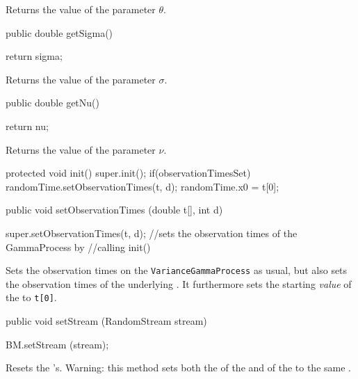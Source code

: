 \begin{tabb} Returns the value of the parameter $\theta$.
\end{tabb}
\begin{code}

   public double getSigma() \begin{hide} { return sigma; }\end{hide}
\end{code}
\begin{tabb} Returns the value of the parameter $\sigma$.
\end{tabb}
\begin{code}

   public double getNu() \begin{hide} { return nu; }\end{hide}
\end{code}
\begin{tabb} Returns the value of the parameter $\nu$.
\end{tabb}
\begin{code}\begin{hide}

    protected void init() {
        super.init();
        if(observationTimesSet){
            randomTime.setObservationTimes(t, d);
            randomTime.x0 = t[0];
        }
    }\end{hide}

    public void setObservationTimes (double t[], int d) \begin{hide} {
        super.setObservationTimes(t, d);  //sets the observation times of the GammaProcess by
    }                                     //calling init()
\end{hide}
\end{code}
\begin{tabb} Sets the observation times on the \texttt{VarianceGammaProcess} as
usual, but also sets the observation times of the underlying
. It furthermore sets the starting \emph{value}
of the  to \texttt{t[0]}.
\end{tabb}
\begin{code}

    public void setStream (RandomStream stream) \begin{hide} {
         BM.setStream (stream);
   }\end{hide}
\end{code}
\begin{tabb}
Resets the 's.
Warning: this method sets both the
 of the
 and of the  to
the same .
\end{tabb}
